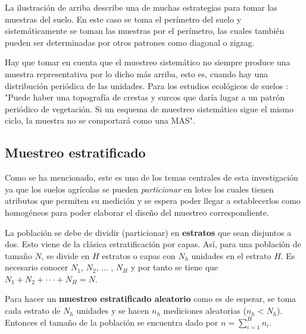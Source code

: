 \documentclass{report}
\begin{document}
La ilustración de arriba describe una de muchas estrategias \cite{lassaga-2011} \cite{gobpe-ministerio-del-ambiente-2014} para tomar las muestras del suelo. En este caso se toma el perímetro del suelo y sistemáticamente se toman las muestras por el perímetro, las cuales también pueden ser determinadas por otros patrones como diagonal o zigzag.

\bigbreak

Hay que tomar en cuenta que el muestreo sistemático no siempre produce una muestra representativa por lo dicho más arriba, esto es, cuando hay una distribución periódica de las unidades. Para los estudios ecológicos de suelos \cite{lohr-2009}: "Puede haber una topografía de crestas y surcos que daría lugar a un patrón periódico de vegetación. Si un esquema de muestreo sistemático sigue el mismo ciclo, la muestra no se comportará como una MAS".

\subsection{Muestreo estratificado}

Como se ha mencionado, este es uno de los temas centrales de esta investigación ya que los suelos agrícolas se pueden \textit{particionar} en lotes los cuales tienen atributos que permiten su medición y se espera poder llegar a establecerlos como homogéneos para poder elaborar el diseño del muestreo correspondiente.

\bigbreak

La población se debe de dividir (particionar) en \textbf{estratos} que sean disjuntos a dos. Esto viene de la clásica estratificación por capas. Así, para una población de tamaño $N$, se divide en $H$ estratos o capas con $N_h$ unidades en el estrato $H$. Es necesario conocer $N_1$, $N_2$, ... , $N_H$ y por tanto se tiene que $N_1 + N_2 + \cdot \cdot \cdot + N_H = N$.

\bigbreak

Para hacer un \textbf{muestreo estratificado aleatorio} como es de esperar, se toma cada estrato de $N_h$ unidades y se hacen $n_h$ mediciones aleatorias ($n_h < N_h$). Entonces el tamaño de la población se encuentra dado por $n = \sum_{i=1}^H n_i$.

\bigbreak
\end{document}
